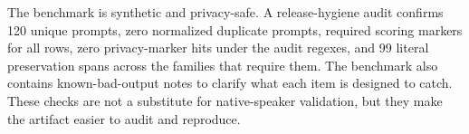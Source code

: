 The benchmark is synthetic and privacy-safe. A release-hygiene audit confirms
120 unique prompts, zero normalized duplicate prompts, required scoring markers
for all rows, zero privacy-marker hits under the audit regexes, and 99 literal
preservation spans across the families that require them. The benchmark also
contains known-bad-output notes to clarify what each item is designed to catch.
These checks are not a substitute for native-speaker validation, but they make
the artifact easier to audit and reproduce.
